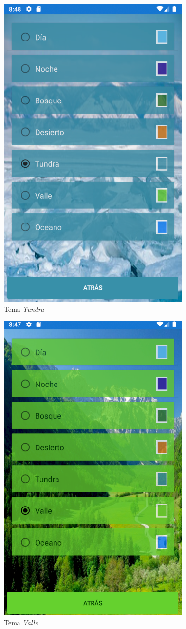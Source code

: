 \begin{figure}[H]
    \centering
    \includegraphics[scale=0.3]{Figures/Capturas/TemaTundra.png}
    \caption{Tema \textit{Tundra}}
    \label{Tundra}    
\end{figure}
\begin{figure}[H]
    \centering
    \includegraphics[scale=0.3]{Figures/Capturas/TemaValle.png}
    \caption{Tema \textit{Valle}}
    \label{Valle}    
\end{figure}
